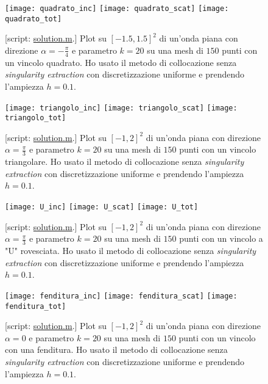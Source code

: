 \begin{figure}[h]
	\centering
	\texttt{[image: quadrato\_inc]}
	\texttt{[image: quadrato\_scat]}
	\texttt{[image: quadrato\_tot]}
	\caption{[script: \href{https://github.com/Daldossi/BEM/blob/main/solution.m}{solution.m}.] Plot su $[-1.5,1.5]^2$ di un'onda piana con direzione $\alpha=-\frac{\pi}{4}$ e parametro $k=20$ su una mesh di $150$ punti con un vincolo quadrato. Ho usato il metodo di collocazione senza \textit{singularity extraction} con discretizzazione uniforme e prendendo l'ampiezza $h=0.1$.}
	\label{quadrato}
\end{figure}
\begin{figure}[h]
	\centering
	\texttt{[image: triangolo\_inc]}
	\texttt{[image: triangolo\_scat]}
	\texttt{[image: triangolo\_tot]}
	\caption{[script: \href{https://github.com/Daldossi/BEM/blob/main/solution.m}{solution.m}.] Plot su $[-1,2]^2$ di un'onda piana con direzione $\alpha=\frac{\pi}{3}$ e parametro $k=20$ su una mesh di $150$ punti con un vincolo triangolare. Ho usato il metodo di collocazione senza \textit{singularity extraction} con discretizzazione uniforme e prendendo l'ampiezza $h=0.1$.}
	\label{triangolo}
\end{figure}
\begin{figure}[h]
	\centering
	\texttt{[image: U\_inc]}
	\texttt{[image: U\_scat]}
	\texttt{[image: U\_tot]}
	\caption{[script: \href{https://github.com/Daldossi/BEM/blob/main/solution.m}{solution.m}.] Plot su $[-1,2]^2$ di un'onda piana con direzione $\alpha=\frac{\pi}{3}$ e parametro $k=20$ su una mesh di $150$ punti con un vincolo a "U" rovesciata. Ho usato il metodo di collocazione senza \textit{singularity extraction} con discretizzazione uniforme e prendendo l'ampiezza $h=0.1$.}
	\label{U}
\end{figure}
\begin{figure}[h]
	\centering
	\texttt{[image: fenditura\_inc]}
	\texttt{[image: fenditura\_scat]}
	\texttt{[image: fenditura\_tot]}
	\caption{[script: \href{https://github.com/Daldossi/BEM/blob/main/solution.m}{solution.m}.] Plot su $[-1,2]^2$ di un'onda piana con direzione $\alpha=0$ e parametro $k=20$ su una mesh di $150$ punti con un vincolo con una fenditura. Ho usato il metodo di collocazione senza \textit{singularity extraction} con discretizzazione uniforme e prendendo l'ampiezza $h=0.1$.}
	\label{fenditura}
\end{figure}
